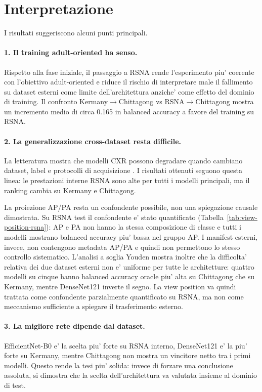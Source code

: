 \documentclass[11pt,a4paper]{article}
\newcommand{\balacc}{balanced accuracy}
\begin{document}
\section{Interpretazione}

I risultati suggeriscono alcuni punti principali.

\paragraph{1. Il training adult-oriented ha senso.}
Rispetto alla fase iniziale, il passaggio a RSNA rende l'esperimento piu'
coerente con l'obiettivo adult-oriented e riduce il rischio di interpretare male
il fallimento su dataset esterni come limite dell'architettura anziche' come
effetto del dominio di training. Il confronto Kermany$\rightarrow$Chittagong vs
RSNA$\rightarrow$Chittagong mostra un incremento medio di circa 0.165 in
\balacc{} a favore del training su RSNA.

\paragraph{2. La generalizzazione cross-dataset resta difficile.}
La letteratura mostra che modelli CXR possono degradare quando cambiano dataset,
label e protocolli di acquisizione \cite{cohen2020limits}. I risultati ottenuti
seguono questa linea: le prestazioni interne RSNA sono alte per tutti i modelli
principali, ma il ranking cambia su Kermany e Chittagong.

La proiezione AP/PA resta un confondente possibile, non una spiegazione causale
dimostrata. Su RSNA test il confondente e' stato quantificato
(Tabella~\ref{tab:view-position-rsna}): AP e PA non hanno la stessa
composizione di classe e tutti i modelli mostrano \balacc{} piu' bassa nel
gruppo AP. I manifest esterni, invece, non contengono metadata AP/PA e quindi
non permettono lo stesso controllo sistematico. L'analisi a soglia Youden mostra
inoltre che la difficolta' relativa dei due dataset esterni non e' uniforme per
tutte le architetture: quattro modelli su cinque hanno \balacc{} oracle piu'
alta su Chittagong che su Kermany, mentre DenseNet121 inverte il segno. La view
position va quindi trattata come confondente parzialmente quantificato su RSNA,
ma non come meccanismo sufficiente a spiegare il trasferimento esterno.

\paragraph{3. La migliore rete dipende dal dataset.}
EfficientNet-B0 e' la scelta piu' forte su RSNA interno, DenseNet121 e' la piu'
forte su Kermany, mentre Chittagong non mostra un vincitore netto tra i primi
modelli. Questo rende la tesi piu' solida: invece di forzare una conclusione
assoluta, si dimostra che la scelta dell'architettura va valutata insieme al
dominio di test.
\end{document}
